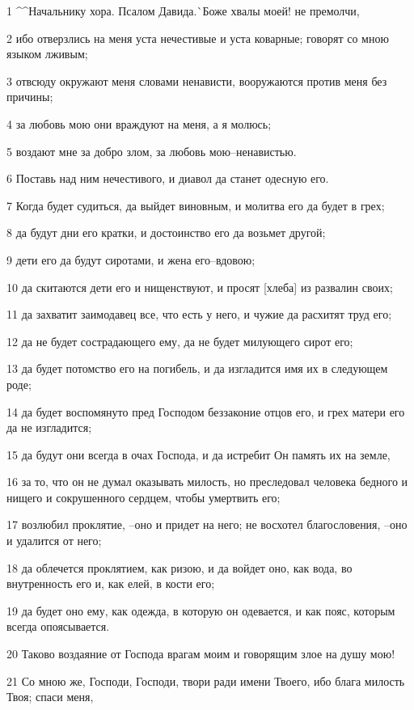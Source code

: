\par 1 ^^Начальнику хора. Псалом Давида.^^ Боже хвалы моей! не премолчи,
\par 2 ибо отверзлись на меня уста нечестивые и уста коварные; говорят со мною языком лживым;
\par 3 отвсюду окружают меня словами ненависти, вооружаются против меня без причины;
\par 4 за любовь мою они враждуют на меня, а я молюсь;
\par 5 воздают мне за добро злом, за любовь мою--ненавистью.
\par 6 Поставь над ним нечестивого, и диавол да станет одесную его.
\par 7 Когда будет судиться, да выйдет виновным, и молитва его да будет в грех;
\par 8 да будут дни его кратки, и достоинство его да возьмет другой;
\par 9 дети его да будут сиротами, и жена его--вдовою;
\par 10 да скитаются дети его и нищенствуют, и просят [хлеба] из развалин своих;
\par 11 да захватит заимодавец все, что есть у него, и чужие да расхитят труд его;
\par 12 да не будет сострадающего ему, да не будет милующего сирот его;
\par 13 да будет потомство его на погибель, и да изгладится имя их в следующем роде;
\par 14 да будет воспомянуто пред Господом беззаконие отцов его, и грех матери его да не изгладится;
\par 15 да будут они всегда в очах Господа, и да истребит Он память их на земле,
\par 16 за то, что он не думал оказывать милость, но преследовал человека бедного и нищего и сокрушенного сердцем, чтобы умертвить его;
\par 17 возлюбил проклятие, --оно и придет на него; не восхотел благословения, --оно и удалится от него;
\par 18 да облечется проклятием, как ризою, и да войдет оно, как вода, во внутренность его и, как елей, в кости его;
\par 19 да будет оно ему, как одежда, в которую он одевается, и как пояс, которым всегда опоясывается.
\par 20 Таково воздаяние от Господа врагам моим и говорящим злое на душу мою!
\par 21 Со мною же, Господи, Господи, твори ради имени Твоего, ибо блага милость Твоя; спаси меня,

